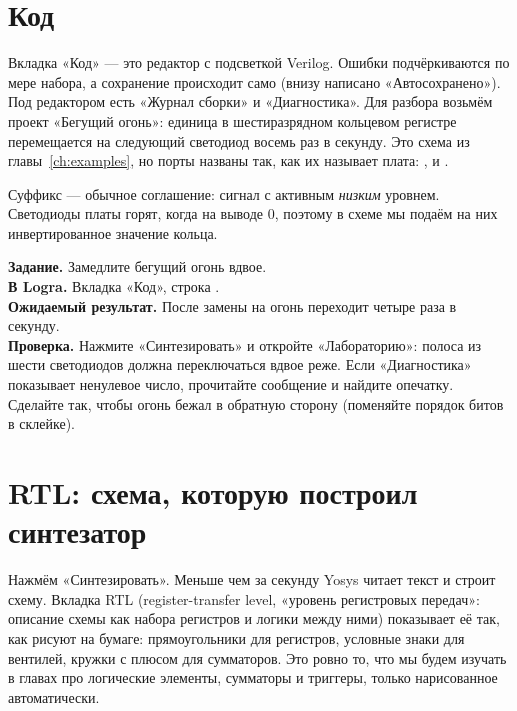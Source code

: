 \section{Код}

Вкладка «Код» --- это редактор с подсветкой Verilog. Ошибки подчёркиваются
по мере набора, а сохранение происходит само (внизу написано «Автосохранено»).
Под редактором есть «Журнал сборки» и «Диагностика». Для разбора возьмём проект
«Бегущий огонь»: единица в шестиразрядном кольцевом регистре перемещается на
следующий светодиод восемь раз в секунду. Это схема из главы~\ref{ch:examples},
но порты названы так, как их называет плата: ,  и
.


\begin{infobox}
Суффикс  --- обычное соглашение: сигнал с активным \emph{низким}
уровнем. Светодиоды платы горят, когда на выводе 0, поэтому в схеме мы
подаём на них инвертированное значение кольца.
\end{infobox}

\begin{diybox}
\textbf{Задание.} Замедлите бегущий огонь вдвое.\\
\textbf{В Logra.} Вкладка «Код», строка .\\
\textbf{Ожидаемый результат.} После замены  на  огонь переходит
четыре раза в секунду.\\
\textbf{Проверка.} Нажмите «Синтезировать» и откройте «Лабораторию»: полоса из
шести светодиодов должна переключаться вдвое реже. Если «Диагностика» показывает
ненулевое число, прочитайте сообщение и найдите опечатку.\\
 Сделайте так, чтобы огонь бежал в обратную сторону (поменяйте
порядок битов в склейке).
\end{diybox}

\section{RTL: схема, которую построил синтезатор}

Нажмём «Синтезировать». Меньше чем за секунду Yosys читает текст и строит
схему. Вкладка RTL (register-transfer level, «уровень регистровых передач»:
описание схемы как набора регистров и логики между ними) показывает её так,
как рисуют на бумаге: прямоугольники для регистров, условные знаки для
вентилей, кружки с плюсом для сумматоров. Это ровно то, что мы будем
изучать в главах про логические элементы, сумматоры и триггеры, только
нарисованное автоматически.

